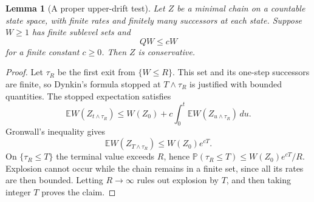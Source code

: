 \documentclass[11pt,a4paper]{article}
\newtheorem{lemma}[theorem]{Lemma}
\theoremstyle{remark}\newtheorem{remark}[theorem]{Remark}
\newcommand{\E}{\mathbb E}
\newcommand{\Prob}{\mathbb P}
\begin{document}
\begin{lemma}[A proper upper-drift test]\label{lem:conservative}
Let $Z$ be a minimal chain on a countable state space, with finite rates and finitely many successors at each state. Suppose $W\ge1$ has finite sublevel sets and
\[
QW\le cW
\]
for a finite constant $c\ge0$. Then $Z$ is conservative.
\end{lemma}
\begin{proof}
Let $\tau_R$ be the first exit from $\{W\le R\}$. This set and its one-step successors are finite, so Dynkin's formula stopped at $T\wedge\tau_R$ is justified with bounded quantities. The stopped expectation satisfies
\[
\E W(Z_{t\wedge\tau_R})
 \le W(Z_0)+c\int_0^t\E W(Z_{u\wedge\tau_R})\,du.
\]
Gronwall's inequality gives
\[
\E W(Z_{T\wedge\tau_R})\le W(Z_0)e^{cT}.
\]
On $\{\tau_R\le T\}$ the terminal value exceeds $R$, hence
$\Prob(\tau_R\le T)\le W(Z_0)e^{cT}/R$. Explosion cannot occur while the chain remains in a finite set, since all its rates are then bounded. Letting $R\to\infty$ rules out explosion by $T$, and then taking integer $T$ proves the claim.
\end{proof}
\end{document}
